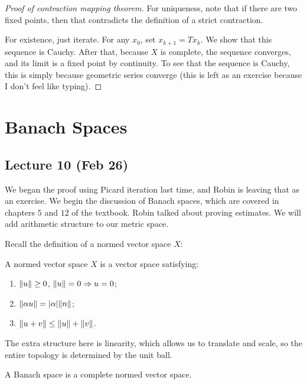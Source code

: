 \documentclass[10pt, twoside]{article}
\begin{document}
    \begin{proof}[Proof of contraction mapping theorem] For uniqueness, note
        that if there are two fixed points, then that contradicts the
        definition of a strict contraction.

        For existence, just iterate. For any $x_0$, set $x_{k+1} = T x_k$. We
    show that this sequence is Cauchy. After that, because $X$ is complete, the
sequence converges, and its limit is a fixed point by continuity. To see that
the sequence is Cauchy, this is simply because geometric series converge (this
is left as an exercise because I don't feel like typing).  \end{proof}

    \section{Banach Spaces}
    
    \subsection{Lecture 10 (Feb 26)} We began the proof using Picard iteration
    last time, and Robin is leaving that as an exercise. We begin the
    discussion of Banach spaces, which are covered in chapters $5$ and $12$ of
    the textbook. Robin talked about proving estimates. We will add arithmetic
    structure to our metric space.

    Recall the definition of a normed vector space $X$:

    \begin{defn} A normed vector space $X$ is a vector
        space satisfying: \begin{enumerate} \item $\lVert u\rVert \geq 0$, $\lVert u\rVert
            = 0 \Rightarrow u = 0$; \item $\lVert\alpha u\rVert = \lvert\alpha\rvert
            \lVert n\rVert$; \item $\lVert u + v\rVert \leq \lVert u\rVert + \lVert v\rVert$.
    \end{enumerate} \end{defn}

    The extra structure here is linearity, which allows us to translate and
    scale, so the entire topology is determined by the unit ball.

    \begin{defn} A Banach space is a complete normed vector
    space.  \end{defn}
\end{document}
